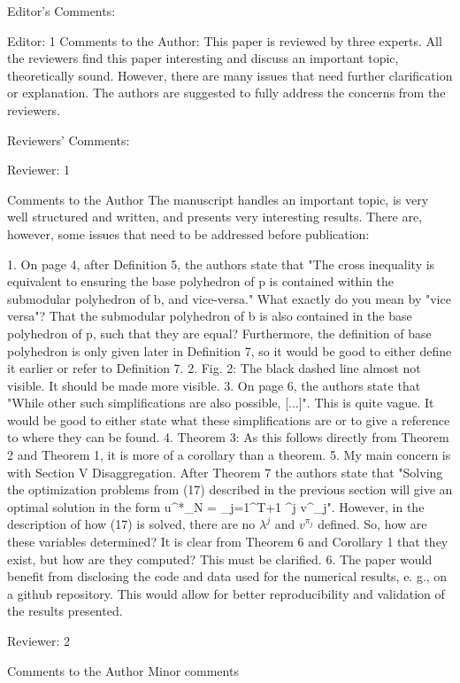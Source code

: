 Editor's Comments:

Editor: 1
Comments to the Author:
This paper is reviewed by three experts. All the reviewers find this paper interesting and discuss an important topic, theoretically sound. However, there are many issues that need further clarification or explanation. The authors are suggested to fully address the concerns from the reviewers.

Reviewers' Comments:

Reviewer: 1

Comments to the Author
The manuscript handles an important topic, is very well structured and written, and presents very interesting results. There are, however, some issues that need to be addressed before publication:

1. On page 4, after Definition 5, the authors state that "The cross inequality is equivalent to ensuring the base polyhedron of p is contained within the submodular polyhedron of b, and vice-versa." What exactly do you mean by "vice versa"? That the submodular polyhedron of b is also contained in the base polyhedron of p, such that they are equal? Furthermore, the definition of base polyhedron is only given later in Definition 7, so it would be good to either define it earlier or refer to Definition 7.
2. Fig. 2: The black dashed line almost not visible. It should be made more visible.
3. On page 6, the authors state that "While other such simplifications are also possible, [...]". This is quite vague. It would be good to either state what these simplifications are or to give a reference to where they can be found.
4. Theorem 3: As this follows directly from Theorem 2 and Theorem 1, it is more of a corollary than a theorem.
5. My main concern is with Section V Disaggregation. After Theorem 7 the authors state that "Solving the optimization problems from (17) described in the previous section will give an optimal solution in the form u^*_N = \sum_{j=1}^{T+1} \lambda^j v^{\pi_j}". However, in the description of how (17) is solved, there are no $\lambda^j$ and $v^{\pi_j}$ defined. So, how are these variables determined? It is clear from Theorem 6 and Corollary 1 that they exist, but how are they computed? This must be clarified.
6. The paper would benefit from disclosing the code and data used for the numerical results, e. g., on a github repository. This would allow for better reproducibility and validation of the results presented.

Reviewer: 2

Comments to the Author
Minor comments

